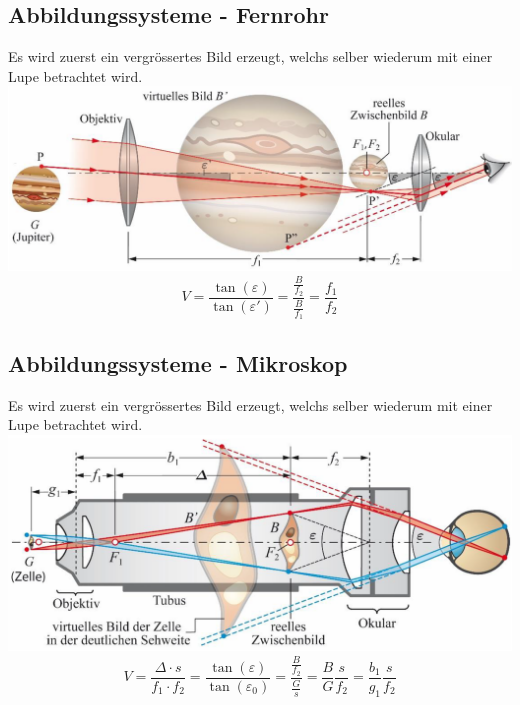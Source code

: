 \subsection{Abbildungssysteme - Fernrohr}

Es wird zuerst ein vergrössertes Bild erzeugt, welchs selber wiederum mit einer Lupe betrachtet wird. \\

\includegraphics[width=0.9\linewidth]{Bilder/Wellen-Optik/fernrohr} \\

$$ \boxed{ V = \frac{\tan(\varepsilon)}{\tan(\varepsilon')} = \frac{\frac{B}{f_2}}{\frac{B}{f_1} } = \frac{f_1}{f_2}  } $$




\subsection{Abbildungssysteme - Mikroskop}

Es wird zuerst ein vergrössertes Bild erzeugt, welchs selber wiederum mit einer Lupe betrachtet wird. \\

\includegraphics[width=0.9\linewidth]{Bilder/Wellen-Optik/mikroskop} \\

$$ \boxed{ V = \frac{\Delta \cdot s}{f_1 \cdot f_2} = \frac{\tan(\varepsilon)}{\tan(\varepsilon_0)} = \frac{\frac{B}{f_2}}{\frac{G}{s}} = \frac{B}{G} \frac{s}{f_2} = \frac{b_1}{g_1} \frac{s}{f_2} } $$


